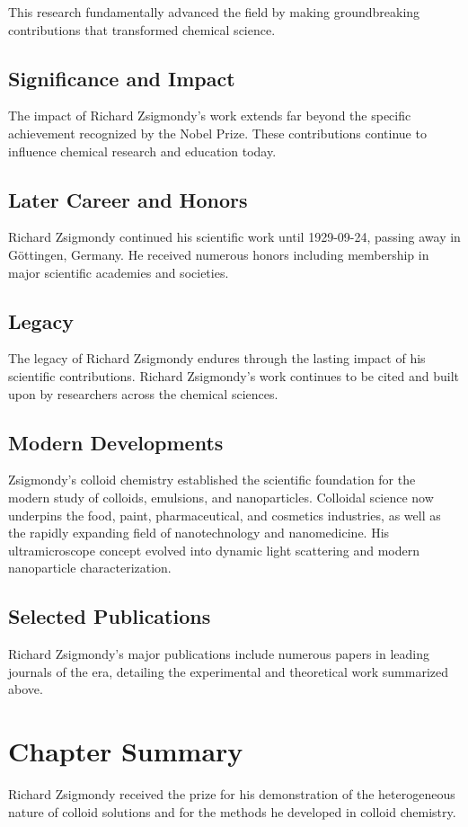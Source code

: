 This research fundamentally advanced the field by making groundbreaking contributions that transformed chemical science.

\subsection*{Significance and Impact}

The impact of Richard Zsigmondy's work extends far beyond the specific achievement recognized by the Nobel Prize.
These contributions continue to influence chemical research and education today.

\subsection*{Later Career and Honors}

Richard Zsigmondy continued his scientific work until 1929-09-24, passing away in Göttingen, Germany.
He received numerous honors including membership in major scientific academies and societies.

\subsection*{Legacy}

The legacy of Richard Zsigmondy endures through the lasting impact of his scientific contributions.
Richard Zsigmondy's work continues to be cited and built upon by researchers across the chemical sciences.

\subsection*{Modern Developments}

Zsigmondy's colloid chemistry established the scientific foundation for the modern study of colloids, emulsions, and nanoparticles. Colloidal science now underpins the food, paint, pharmaceutical, and cosmetics industries, as well as the rapidly expanding field of nanotechnology and nanomedicine. His ultramicroscope concept evolved into dynamic light scattering and modern nanoparticle characterization.

\subsection*{Selected Publications}

Richard Zsigmondy's major publications include numerous papers in leading journals of the era, detailing the experimental and theoretical work summarized above.

\clearpage

\section*{Chapter Summary}

Richard Zsigmondy received the prize for his demonstration of the heterogeneous nature of colloid solutions and for the methods he developed in colloid chemistry.
